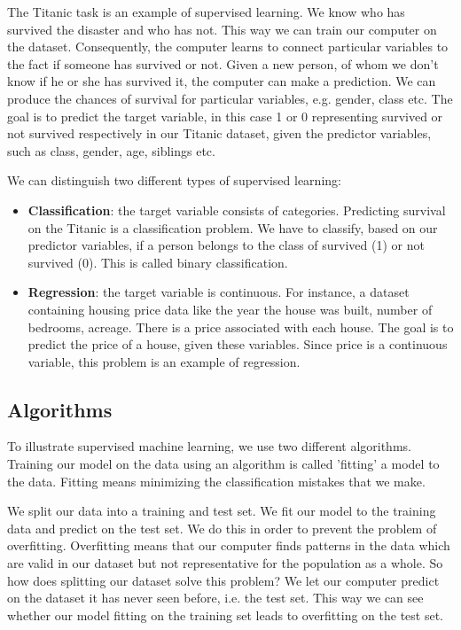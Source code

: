 \documentclass[11pt]{article}
\begin{document}
The Titanic task is an example of supervised learning. We know who has survived the disaster and who has not. This way we can train our computer on the dataset. Consequently, the computer learns to connect particular variables to the fact if someone has survived or not. Given a new person, of whom we don't know if he or she has survived it, the computer can make a prediction. We can produce the chances of survival for particular variables, e.g. gender, class etc. The goal is to predict the target variable, in this case 1 or 0 representing survived or not survived respectively in our Titanic dataset, given the predictor variables, such as class, gender, age, siblings etc. 

We can distinguish two different types of supervised learning: 
\begin{itemize}
\item \textbf{Classification}: the target variable consists of categories. Predicting survival on the Titanic is a classification problem. We have to classify, based on our predictor variables, if a person belongs to the class of survived (1) or not survived (0). This is called binary classification.
\item \textbf{Regression}: the target variable is continuous. For instance, a dataset containing housing price data like the year the house was built, number of bedrooms, acreage. There is a price associated with each house. The goal is to predict the price of a house, given these variables. Since price is a continuous variable, this problem is an example of regression.
\end{itemize}


\subsection{Algorithms}
\label{sec:org7a93d75}
To illustrate supervised machine learning, we use two different algorithms. Training our model on the data using an algorithm is called 'fitting' a model to the data. Fitting means minimizing the classification mistakes that we make. 

We split our data into a training and test set. We fit our model to the training data and predict on the test set. We do this in order to prevent the problem of overfitting. Overfitting means that our computer finds patterns in the data which are valid in our dataset but not representative for the population as a whole. So how does splitting our dataset solve this problem? We let our computer predict on the dataset it has never seen before, i.e. the test set. This way we can see whether our model fitting on the training set leads to overfitting on the test set. 
\end{document}
